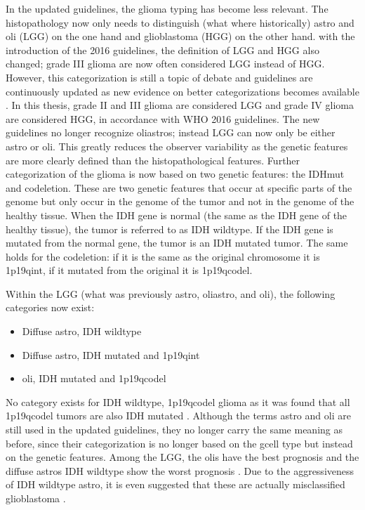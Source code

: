 In the updated guidelines, the \gls{glioma} typing has become less relevant.
The histopathology now only needs to distinguish (what where historically) \gls{astro} and \gls{oli} (\gls{LGG}) on the one hand and \gls{glioblastoma} (\gls{HGG}) on the other hand.
with the introduction of the 2016 guidelines, the definition of \gls{LGG} and \gls{HGG} also changed; grade III \gls{glioma} are now often considered \gls{LGG} instead of \gls{HGG}.
However, this categorization is still a topic of debate and guidelines are continuously updated as new evidence on better categorizations becomes available \autocite{lous2020impactnow}.
In this thesis, grade II and III \gls{glioma} are considered \gls{LGG} and grade IV \gls{glioma} are considered \gls{HGG}, in accordance with \gls{WHO} 2016 guidelines.
The new guidelines no longer recognize \glspl{oliastro}; instead \gls{LGG} can now only be either \gls{astro} or \gls{oli}.
This greatly reduces the observer variability as the genetic features are more clearly defined than the histopathological features.
Further categorization of the \gls{glioma} is now based on two genetic features:  the \gls{IDHmut} and \gls{codeletion}.
These are two genetic features that occur at specific parts of the genome but only occur in the genome of the \gls{tumor} and not in the genome of the healthy tissue.
When the \gls{IDH} gene is normal (the same as the \gls{IDH} gene of the healthy tissue), the \gls{tumor} is referred to as \gls{IDH} wildtype.
If the \gls{IDH} gene is mutated from the normal gene, the \gls{tumor} is an \gls{IDH} mutated \gls{tumor}.
The same holds for the \gls{codeletion}: if it is the same as the original chromosome it is \acl{1p19qint}, if it mutated from the original it is \acl{1p19qcodel}.

Within the \gls{LGG} (what was previously \gls{astro}, \gls{oliastro}, and \gls{oli}), the following categories now exist:
\begin{itemize}
    \item Diffuse \gls{astro}, \gls{IDH} wildtype
    \item Diffuse \gls{astro}, \gls{IDH} mutated and \acl{1p19qint}
    \item \Gls{oli}, \gls{IDH} mutated and \acl{1p19qcodel}
\end{itemize}
No category exists for \gls{IDH} wildtype, \acl{1p19qcodel} \gls{glioma} as it was found that all \acl{1p19qcodel} \glspl{tumor} are also \gls{IDH} mutated \autocite{labussi20101p19qcodeletedIDH}.
Although the terms \gls{astro} and \gls{oli} are still used in the updated guidelines, they no longer carry the same meaning as before, since their categorization is no longer based on the \gls{gcell} type but instead on the genetic features.
Among the \gls{LGG}, the \glspl{oli} have the best prognosis and the diffuse \glspl{astro} \gls{IDH} wildtype show the worst prognosis \autocite{eckel2015gliomagroups}.
Due to the aggressiveness of \gls{IDH} wildtype \gls{astro}, it is even suggested that these are actually misclassified \gls{glioblastoma} \autocite{hartmann2010IDH1gbm, brat2018IMPACT}.




